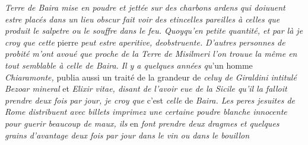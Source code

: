 \textit{Terre de Baira\protect{} mise en poudre et jett\'{e}e sur des charbons ardens qui doiuuent estre plac\'{e}s dans un lieu obscur fait voir des etincelles pareilles \`{a} celles que produit le salpetre ou le souffre dans le feu.
Quoyqu'en petite quantit\'{e}, et par l\`{a} je croy que cette} pierre \textit{peut estre aperitive, deobstruente.}
\textit{D'autres personnes de probit\'{e} m'ont avou\'{e} que proche de la Terre de Misilmeri l'on trou\-ue la m\^{e}me en tout semblable \`{a} celle de Baira.}
%
% 
\textit{Il y a quelques ann\'{e}es qu}'un homme \textit{Chiaramonte,\protect{}}
publia aussi un trait\'{e} de la grandeur de \textit{celuy de Giraldini\protect{} intitul\'{e} Bezoar mineral}\protect{} et \textit{Elixir vitae\protect{}, disant de l'avoir eue de la Sicile\protect{} qu'il la falloit prendre deux fois par jour, je croy que} c'est \textit{celle} de \textit{Baira. Les peres jesuites de Rome\protect{} distribuent avec billets imprimez une certaine poudre blanche innocente pour guerir beaucoup de maux, ils} en \textit{font prendre deux dragmes et quelques grains d'avantage deux fois par jour dans le vin ou dans le bouillon}%